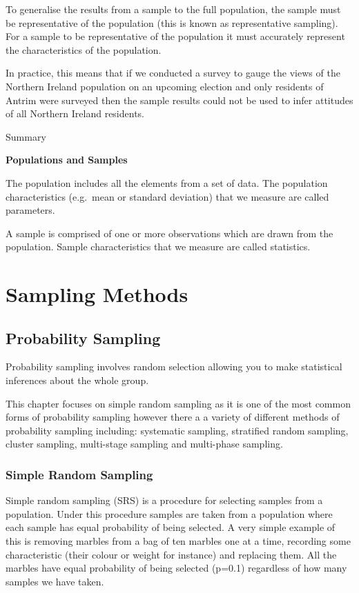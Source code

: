 \documentclass[
]{book}
\begin{document}
To generalise the results from a sample to the full population, the sample must be representative of the population (this is known as representative sampling). For a sample to be representative of the population it must accurately represent the characteristics of the population.

In practice, this means that if we conducted a survey to gauge the views of the Northern Ireland population on an upcoming election and only residents of Antrim were surveyed then the sample results could not be used to infer attitudes of all Northern Ireland residents.

Summary

\textbf{Populations and Samples}

The population includes all the elements from a set of data. The population characteristics (e.g.~mean or standard deviation) that we measure are called parameters.

A sample is comprised of one or more observations which are drawn from the population. Sample characteristics that we measure are called statistics.

\hypertarget{sampling-methods}{%
\section{Sampling Methods}\label{sampling-methods}}

\hypertarget{probability-sampling}{%
\subsection{Probability Sampling}\label{probability-sampling}}

Probability sampling involves random selection allowing you to make statistical inferences about the whole group.

This chapter focuses on simple random sampling as it is one of the most common forms of probability sampling however there a a variety of different methods of probability sampling including: systematic sampling, stratified random sampling, cluster sampling, multi-stage sampling and multi-phase sampling.

\hypertarget{simple-random-sampling}{%
\subsubsection{Simple Random Sampling}\label{simple-random-sampling}}

Simple random sampling (SRS) is a procedure for selecting samples from a population. Under this procedure samples are taken from a population where each sample has equal probability of being selected. A very simple example of this is removing marbles from a bag of ten marbles one at a time, recording some characteristic (their colour or weight for instance) and replacing them. All the marbles have equal probability of being selected (p=0.1) regardless of how many samples we have taken.
\end{document}

